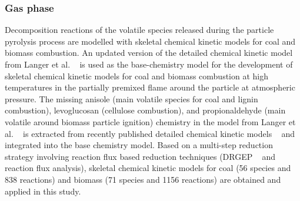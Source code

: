 \begin{btUnit}
\subsubsection{Gas phase} 
Decomposition reactions of the volatile species released during the particle pyrolysis process are modelled with skeletal chemical kinetic models for coal and biomass combustion. An updated version of the detailed chemical kinetic model from Langer et al. ~\cite{Langer2023} is used as the base-chemistry model for the development of skeletal chemical kinetic models for coal and biomass combustion at high temperatures in the partially premixed flame around the particle at atmospheric pressure. The missing anisole (main volatile species for coal and lignin combustion), levoglucosan (cellulose combustion), and propionaldehyde (main volatile around biomass particle ignition) chemistry in the model from Langer et al. ~\cite{Langer2023} is extracted from recently published detailed chemical kinetic models ~\cite{Wagnon2018, Debiagi2016, Pelucchi2015} and integrated into the base chemistry model. Based on a multi-step reduction strategy involving reaction flux based reduction techniques (DRGEP ~\cite{PepiotDesjardins2008} and reaction flux analysis), skeletal chemical kinetic models for coal (56 species and 838 reactions) and biomass (71 species and 1156 reactions) are obtained and applied in this study.



\end{btUnit}
